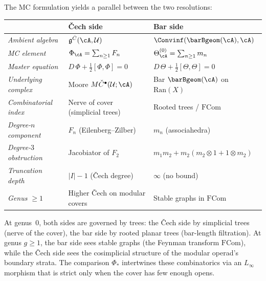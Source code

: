 \begin{remark}
\label{rem:cech-bar-dictionary}
The MC formulation yields a parallel between the two resolutions:
\begin{center}
\renewcommand{\arraystretch}{1.3}
\begin{tabular}{lll}
& \textbf{\v{C}ech side} & \textbf{Bar side} \\
\hline
\textit{Ambient algebra}
 & $\mathfrak{g}^{\check{C}}(\cA,\mathcal{U})$
 & $\Convinf(\barBgeom(\cA),\cA)$ \\
\textit{MC element}
 & $\Phi_\cA = \sum_{n \geq 1} F_n$
 & $\Theta^{(0)}_\cA = \sum_{n \geq 1} m_n$ \\
\textit{Master equation}
 & $D\,\Phi + \tfrac{1}{2}[\Phi,\Phi] = 0$
 & $D\,\Theta + \tfrac{1}{2}[\Theta,\Theta] = 0$ \\
\textit{Underlying complex}
 & Moore $M\check{C}^\bullet(\mathcal{U};\cA)$
 & Bar $\barBgeom(\cA)$ on $\mathrm{Ran}(X)$ \\
\textit{Combinatorial index}
 & Nerve of cover (simplicial trees)
 & Rooted trees / $\mathrm{FCom}$ \\
\textit{Degree-$n$ component}
 & $F_n$ (Eilenberg--Zilber)
 & $m_n$ (associahedra) \\
\textit{Degree-$3$ obstruction}
 & Jacobiator of $F_2$
 & $m_1 m_2 + m_2(m_2 \otimes 1 + 1 \otimes m_2)$ \\
\textit{Truncation depth}
 & $|I| - 1$ (\v{C}ech degree)
 & $\infty$ (no bound) \\
\textit{Genus $\geq 1$}
 & Higher \v{C}ech on modular covers
 & Stable graphs in $\mathrm{FCom}$ \\
\end{tabular}
\end{center}
At genus~$0$, both sides are governed by trees: the
\v{C}ech side by simplicial trees (nerve of the cover),
the bar side by rooted planar trees (bar-length
filtration). At genus $g \geq 1$, the bar side sees stable
graphs (the Feynman transform $\mathrm{FCom}$), while the
\v{C}ech side sees the cosimplicial structure of the modular
operad's boundary strata. The comparison
$\Phi_*$ intertwines these combinatorics via an $L_\infty$
morphism that is strict only when the cover has few enough
opens.
\end{remark}


